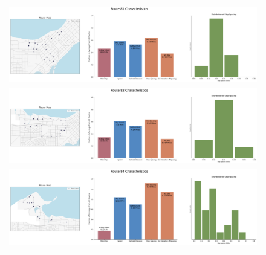\documentclass[letter]{article}
\begin{document}
\begin{figure}
\begin{center}
\begin{tabular}{ c }

  \includegraphics[width=150mm]{Route_81.png}  \\
  \includegraphics[width=150mm]{Route_82.png}  \\
  \includegraphics[width=150mm]{Route_84.png}   \\ 

\end{tabular}
\end{center}
\end{figure}
\end{document}
